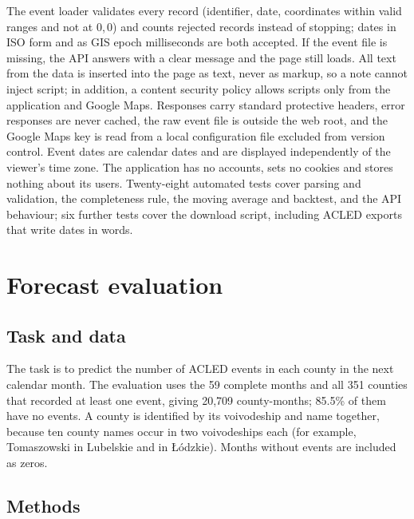 \documentclass[11pt,a4paper]{article}
\begin{document}
The event loader validates every record (identifier, date, coordinates within valid ranges and not at 0,\,0) and counts rejected records instead of stopping; dates in ISO form and as GIS epoch milliseconds are both accepted. If the event file is missing, the API answers with a clear message and the page still loads. All text from the data is inserted into the page as text, never as markup, so a note cannot inject script; in addition, a content security policy allows scripts only from the application and Google Maps. Responses carry standard protective headers, error responses are never cached, the raw event file is outside the web root, and the Google Maps key is read from a local configuration file excluded from version control. Event dates are calendar dates and are displayed independently of the viewer's time zone. The application has no accounts, sets no cookies and stores nothing about its users. Twenty-eight automated tests cover parsing and validation, the completeness rule, the moving average and backtest, and the API behaviour; six further tests cover the download script, including ACLED exports that write dates in words.

\section{Forecast evaluation}
\label{sec:eval}

\subsection{Task and data}

The task is to predict the number of ACLED events in each county in the next calendar month. The evaluation uses the 59 complete months and all 351 counties that recorded at least one event, giving 20{,}709 county-months; 85.5\% of them have no events. A county is identified by its voivodeship and name together, because ten county names occur in two voivodeships each (for example, Tomaszowski in Lubelskie and in Łódzkie). Months without events are included as zeros.

\subsection{Methods}
\end{document}
